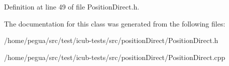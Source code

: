 Definition at line 49 of file Position\-Direct.\-h.



The documentation for this class was generated from the following files\-:\begin{DoxyCompactItemize}
\item 
/home/pegua/src/test/icub-\/tests/src/position\-Direct/Position\-Direct.\-h\item 
/home/pegua/src/test/icub-\/tests/src/position\-Direct/Position\-Direct.\-cpp\end{DoxyCompactItemize}
